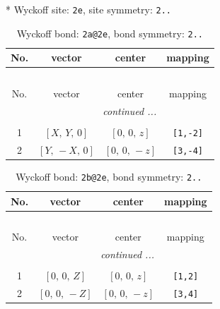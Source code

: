 \documentclass[fleqn,8pt]{jsarticle}
\begin{document}
* Wyckoff site: {\tt 2e}, site symmetry: {\tt 2..}
\renewcommand{\arraystretch}{1.2}
\begin{longtable}{cccc}
\caption{Wyckoff bond: {\tt 2a@2e}, bond symmetry: {\tt 2..}}
 \\
 \hline \hline
No. & vector & center & mapping \\ \hline \endfirsthead

\multicolumn{3}{l}{\tablename\ \thetable{}} \\
 \hline \hline
No. & vector & center & mapping \\ \hline \endhead

 \hline \hline
\multicolumn{3}{r}{\footnotesize\it continued ...} \\ \endfoot

 \hline \hline
\multicolumn{3}{r}{} \\ \endlastfoot

1 & $\left[ X,\, Y,\, 0 \right]$ & $\left[ 0,\, 0,\, z \right]$ & {\tt [1,-2]} \\ \hline
2 & $\left[ Y,\, - X,\, 0 \right]$ & $\left[ 0,\, 0,\, - z \right]$ & {\tt [3,-4]} \\
\end{longtable}
\renewcommand{\arraystretch}{1.2}
\begin{longtable}{cccc}
\caption{Wyckoff bond: {\tt 2b@2e}, bond symmetry: {\tt 2..}}
 \\
 \hline \hline
No. & vector & center & mapping \\ \hline \endfirsthead

\multicolumn{3}{l}{\tablename\ \thetable{}} \\
 \hline \hline
No. & vector & center & mapping \\ \hline \endhead

 \hline \hline
\multicolumn{3}{r}{\footnotesize\it continued ...} \\ \endfoot

 \hline \hline
\multicolumn{3}{r}{} \\ \endlastfoot

1 & $\left[ 0,\, 0,\, Z \right]$ & $\left[ 0,\, 0,\, z \right]$ & {\tt [1,2]} \\ \hline
2 & $\left[ 0,\, 0,\, - Z \right]$ & $\left[ 0,\, 0,\, - z \right]$ & {\tt [3,4]} \\
\end{longtable}
\renewcommand{\arraystretch}{1.2}
\end{document}
